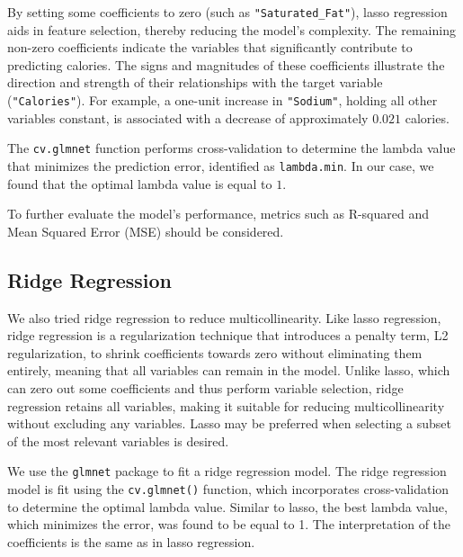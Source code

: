 \documentclass[
]{article}
\newenvironment{Shaded}{\begin{snugshade}}{\end{snugshade}}
\newcommand{\AttributeTok}[1]{\textcolor[rgb]{0.13,0.29,0.53}{#1}}
\newcommand{\ConstantTok}[1]{\textcolor[rgb]{0.56,0.35,0.01}{#1}}
\newcommand{\DecValTok}[1]{\textcolor[rgb]{0.00,0.00,0.81}{#1}}
\newcommand{\FunctionTok}[1]{\textcolor[rgb]{0.13,0.29,0.53}{\textbf{#1}}}
\newcommand{\NormalTok}[1]{#1}
\newcommand{\OtherTok}[1]{\textcolor[rgb]{0.56,0.35,0.01}{#1}}
\newcommand{\SpecialCharTok}[1]{\textcolor[rgb]{0.81,0.36,0.00}{\textbf{#1}}}
\newcommand{\StringTok}[1]{\textcolor[rgb]{0.31,0.60,0.02}{#1}}
\begin{document}
By setting some coefficients to zero (such as
\texttt{"Saturated\_Fat"}), lasso regression aids in feature selection,
thereby reducing the model's complexity. The remaining non-zero
coefficients indicate the variables that significantly contribute to
predicting calories. The signs and magnitudes of these coefficients
illustrate the direction and strength of their relationships with the
target variable (\texttt{"Calories"}). For example, a one-unit increase
in \texttt{"Sodium"}, holding all other variables constant, is
associated with a decrease of approximately \(0.021\) calories.

The \texttt{cv.glmnet} function performs cross-validation to determine
the lambda value that minimizes the prediction error, identified as
\texttt{lambda.min}. In our case, we found that the optimal lambda value
is equal to \(1\).

To further evaluate the model's performance, metrics such as R-squared
and Mean Squared Error (MSE) should be considered.

\subsection{Ridge Regression}\label{ridge-regression}

We also tried ridge regression to reduce multicollinearity. Like lasso
regression, ridge regression is a regularization technique that
introduces a penalty term, L2 regularization, to shrink coefficients
towards zero without eliminating them entirely, meaning that all
variables can remain in the model. Unlike lasso, which can zero out some
coefficients and thus perform variable selection, ridge regression
retains all variables, making it suitable for reducing multicollinearity
without excluding any variables. Lasso may be preferred when selecting a
subset of the most relevant variables is desired.

We use the \texttt{glmnet} package to fit a ridge regression model. The
ridge regression model is fit using the \texttt{cv.glmnet()} function,
which incorporates cross-validation to determine the optimal lambda
value. Similar to lasso, the best lambda value, which minimizes the
error, was found to be equal to 1. The interpretation of the
coefficients is the same as in lasso regression.

\begin{Shaded}
\end{Shaded}
\end{document}
